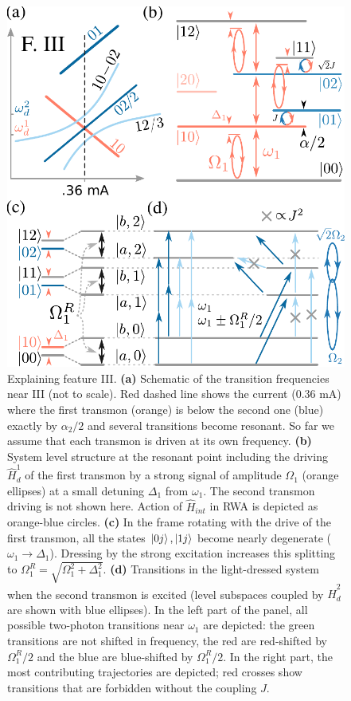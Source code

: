 \documentclass[%
 pra,
 amsmath,amssymb,
 reprint,%
]{revtex4-1}
\begin{document}
\begin{figure}
	\centering
	\includegraphics[width=\linewidth]{main_scheme_2}  
	\caption{Explaining feature III. \textbf{(a)} 
	Schematic of the transition frequencies near 
	III (not to scale). Red dashed line shows the 
	current (0.36 mA) where the first transmon 
	(orange) is below the second one (blue) 
	exactly by $\alpha_2/2$ and several 
	transitions become resonant. So far we assume 
	that each transmon is driven at its own 
	frequency. \textbf{(b)} System level 
	structure at the resonant point including the 
	driving $\hat H_{d}^1$ of the first transmon 
	by a strong signal of amplitude $\Omega_1$ 
	(orange ellipses) at a small detuning 
	$\Delta_1$ from $\omega_1$. The second 
	transmon driving is not shown here. Action of 
	$\hat H_{int}$ in RWA is depicted as 
	orange-blue circles. \textbf{(c)} In the 
	frame rotating with the drive of the first 
	transmon, all the states $\ket{0j},\ket{1j}$ 
	become nearly degenerate ($\omega_1 
	\rightarrow \Delta_1$). Dressing by the 
	strong excitation increases this splitting to 
	$\Omega_1^R = \sqrt{\Omega_1^2 + 
	\Delta_1^2}$. \textbf{(d)} Transitions in the 
	light-dressed system when the second transmon 
	is excited (level subspaces coupled by $\hat 
	H_{d}^2$ are shown with blue ellipses). In 
	the left part of the panel, all possible 
	two-photon transitions near $\omega_1$ are 
	depicted: the green transitions are not 
	shifted in frequency, the red are red-shifted 
	by $\Omega^R_1/2$ and the blue are 
	blue-shifted by $\Omega^R_1/2$. In the right 
	part, the most contributing trajectories are 
	depicted; red crosses show transitions that 
	are forbidden without the coupling $J$.}
	\label{fig:main_scheme}
\end{figure}
\end{document}
